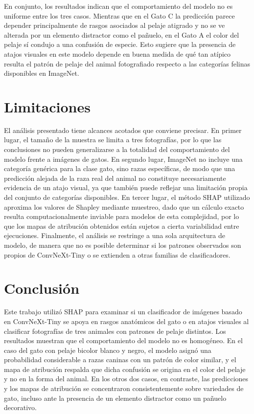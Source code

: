 \documentclass[11pt]{article}
\begin{document}
En conjunto, los resultados indican que el comportamiento del modelo no es uniforme entre los tres casos. Mientras que en el Gato C la predicción parece depender principalmente de rasgos asociados al pelaje atigrado y no se ve alterada por un elemento distractor como el pañuelo, en el Gato A el color del pelaje sí condujo a una confusión de especie. Esto sugiere que la presencia de atajos visuales en este modelo depende en buena medida de qué tan atípico resulta el patrón de pelaje del animal fotografiado respecto a las categorías felinas disponibles en ImageNet.

\section{Limitaciones}

El análisis presentado tiene alcances acotados que conviene precisar. En primer lugar, el tamaño de la muestra se limita a tres fotografías, por lo que las conclusiones no pueden generalizarse a la totalidad del comportamiento del modelo frente a imágenes de gatos. En segundo lugar, ImageNet no incluye una categoría genérica para la clase gato, sino razas específicas, de modo que una predicción alejada de la raza real del animal no constituye necesariamente evidencia de un atajo visual, ya que también puede reflejar una limitación propia del conjunto de categorías disponibles. En tercer lugar, el método SHAP utilizado aproxima los valores de Shapley mediante muestreo, dado que un cálculo exacto resulta computacionalmente inviable para modelos de esta complejidad, por lo que los mapas de atribución obtenidos están sujetos a cierta variabilidad entre ejecuciones. Finalmente, el análisis se restringe a una sola arquitectura de modelo, de manera que no es posible determinar si los patrones observados son propios de ConvNeXt-Tiny o se extienden a otras familias de clasificadores.

\section{Conclusión}

Este trabajo utilizó SHAP para examinar si un clasificador de imágenes basado en ConvNeXt-Tiny se apoya en rasgos anatómicos del gato o en atajos visuales al clasificar fotografías de tres animales con patrones de pelaje distintos. Los resultados muestran que el comportamiento del modelo no es homogéneo. En el caso del gato con pelaje bicolor blanco y negro, el modelo asignó una probabilidad considerable a razas caninas con un patrón de color similar, y el mapa de atribución respalda que dicha confusión se origina en el color del pelaje y no en la forma del animal. En los otros dos casos, en contraste, las predicciones y los mapas de atribución se concentraron consistentemente sobre variedades de gato, incluso ante la presencia de un elemento distractor como un pañuelo decorativo.
\end{document}
